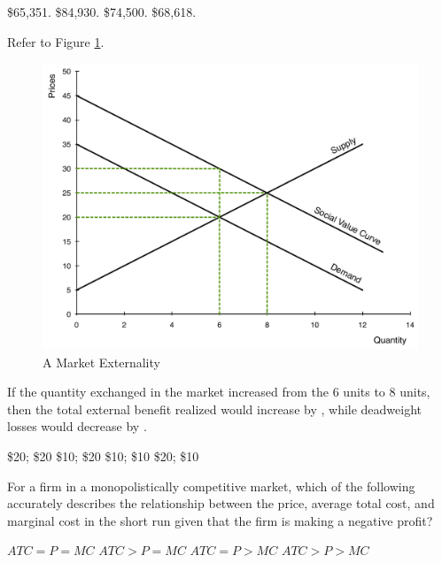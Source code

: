 \documentclass[addpoints,11pt]{exam}
\theoremstyle{definition}
\newcommand{\blank}[0]{\underline{\hspace{3cm}}}
\begin{document}
\begin{questions}
\begin{choices}
	\CorrectChoice \$65,351.
	\choice \$84,930.
	\choice \$74,500.
	\choice \$68,618.
\end{choices}

\question Refer to Figure \ref{MC5}. 

\begin{figure}[H]
	\centering
	\includegraphics[scale=.40]{Exam_Review5.pdf}
	\caption{A Market Externality}
	\label{MC5}
\end{figure}

If the quantity exchanged in the market increased from the 6 units to 8 units, then the total external benefit realized would increase by \underline{\hspace{3cm}}, while deadweight losses would decrease by \blank.

\begin{choices}
	\choice \$20; \$20
	\choice \$10; \$20
	\choice \$10; \$10
	\CorrectChoice \$20; \$10
\end{choices}

\question For a firm in a monopolistically competitive market, which of the following accurately describes the relationship between the price, average total cost, and marginal cost in the short run given that the firm is making a negative profit?

\begin{choices}
	\choice $ATC = P = MC$
	\choice $ATC > P = MC$
	\choice $ATC = P > MC$
	\CorrectChoice $ATC > P > MC$
\end{choices}

\newpage


\end{questions}
\end{document}

